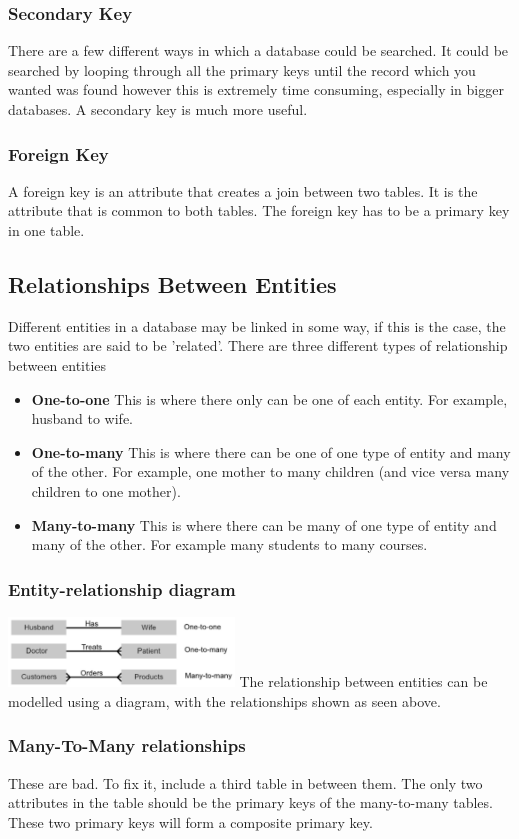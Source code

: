 \documentclass[a4paper,11pt, twocolumn]{article}
\begin{document}
\subsubsection{Secondary Key}
There are a few different ways in which a database could be searched. It could be searched by looping through all the primary keys until the record which you wanted was found however this is extremely time consuming, especially in bigger databases. A secondary key is much more useful.
\subsubsection{Foreign Key}
A foreign key is an attribute that creates a join between two tables. It is the attribute that is common to both tables. The foreign key has to be a primary key in one table.
\subsection{Relationships Between Entities}
Different entities in a database may be linked in some way, if this is the case, the two entities are said to be 'related'. There are three different types of relationship between entities
\begin{itemize}
    \item \textbf{One-to-one} This is where there only can be one of each entity. For example, husband to wife.
    \item \textbf{One-to-many} This is where there can be one of one type of entity and many of the other. For example, one mother to many children (and vice versa many children to one mother).
    \item \textbf{Many-to-many} This is where there can be many of one type of entity and many of the other. For example many students to many courses.
\end{itemize}
\subsubsection{Entity-relationship diagram}
\includegraphics[width=0.45\textwidth]{images/entityRelationship.jpg}
The relationship between entities can be modelled using a diagram, with the relationships shown as seen above. 
\subsubsection{Many-To-Many relationships}
These are bad. To fix it, include a third table in between them. The only two attributes in the table should be the primary keys of the many-to-many tables. These  two primary keys will form a composite primary key.
\end{document}
